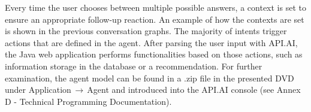 
Every time the user chooses between multiple possible answers, a context is set to ensure an appropriate follow-up reaction. An example of how the contexts are set is shown in the previous conversation graphs. The majority of intents trigger actions that are defined in the agent. After parsing the user input with API.AI, the Java web application performs functionalities based on those actions, such as information storage in the database or a recommendation. For further examination, the agent model can be found in a .zip file in the presented DVD under Application$\,\to\,$Agent and introduced into the API.AI console (see Annex D - Technical Programming Documentation).